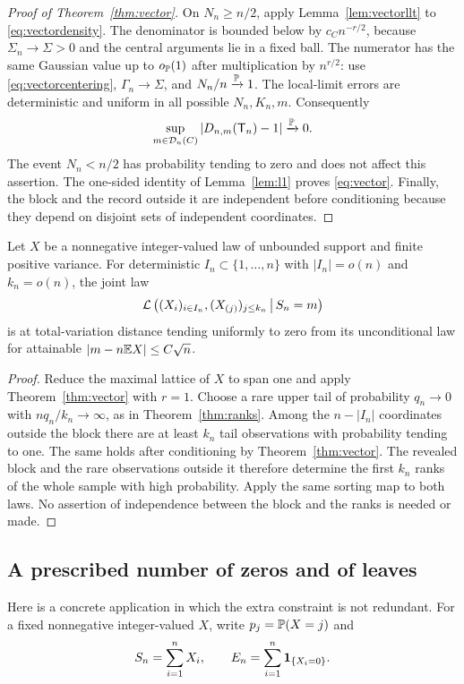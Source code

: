 \begin{proof}[Proof of Theorem~\ref{thm:vector}]
On $N_n\ge n/2$, apply Lemma~\ref{lem:vectorllt} to \eqref{eq:vectordensity}. The denominator is bounded below by $c_C n^{-r/2}$, because $\Sigma_n\to\Sigma>0$ and the central arguments lie in a fixed ball. The numerator has the same Gaussian value up to $o_{\mathbb P}(1)$ after multiplication by $n^{r/2}$: use \eqref{eq:vectorcentering}, $\Gamma_n\to\Sigma$, and $N_n/n\xrightarrow{\mathbb P}1$. The local-limit errors are deterministic and uniform in all possible $N_n,K_n,m$. Consequently
\[
 \sup_{m\in\mathcal D_n(C)}|D_{n,m}(\mathsf T_n)-1|\xrightarrow{\mathbb P}0.
\]
The event $N_n<n/2$ has probability tending to zero and does not affect this assertion. The one-sided identity of Lemma~\ref{lem:l1} proves \eqref{eq:vector}. Finally, the block and the record outside it are independent before conditioning because they depend on disjoint sets of independent coordinates.
\end{proof}

\begin{corollary}\label{cor:blockranks}
Let $X$ be a nonnegative integer-valued law of unbounded support and finite positive variance. For deterministic $I_n\subset\{1,\ldots,n\}$ with $|I_n|=o(n)$ and $k_n=o(n)$, the joint law
\[
 \mathcal L\left((X_i)_{i\in I_n},(X_{(j)})_{j\le k_n}\,\middle|\,S_n=m\right)
\]
is at total-variation distance tending uniformly to zero from its unconditional law for attainable $|m-n\mathbb E X|\le C\sqrt n$.
\end{corollary}
\begin{proof}
Reduce the maximal lattice of $X$ to span one and apply Theorem~\ref{thm:vector} with $r=1$. Choose a rare upper tail of probability $q_n\to0$ with $nq_n/k_n\to\infty$, as in Theorem~\ref{thm:ranks}. Among the $n-|I_n|$ coordinates outside the block there are at least $k_n$ tail observations with probability tending to one. The same holds after conditioning by Theorem~\ref{thm:vector}. The revealed block and the rare observations outside it therefore determine the first $k_n$ ranks of the whole sample with high probability. Apply the same sorting map to both laws. No assertion of independence between the block and the ranks is needed or made.
\end{proof}

\subsection{A prescribed number of zeros and of leaves}
Here is a concrete application in which the extra constraint is not redundant. For a fixed nonnegative integer-valued $X$, write $p_j=\mathbb P(X=j)$ and
\[
 S_n=\sum_{i=1}^nX_i,\qquad E_n=\sum_{i=1}^n\mathbf 1_{\{X_i=0\}}.
\]

